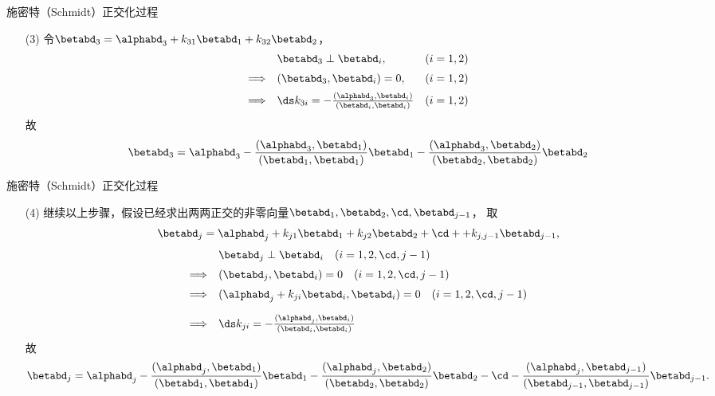 \begin{frame}
  \begin{footnotesize}
    \begin{block}{施密特（Schmidt）正交化过程}
      
      \begin{itemize}
      \item[(3)] 令$\betabd_3=\alphabd_3+k_{31}\betabd_1+k_{32}\betabd_2$，
        $$
        \begin{array}{rll}
          &\betabd_3\perp\betabd_i, & (i=1,2)\\[0.2cm]
          \Longrightarrow&(\betabd_3,\betabd_i)=0, & (i=1,2)\\[0.2cm]
          \Longrightarrow& \ds k_{3i}=-\frac{(\alphabd_3,\betabd_i)}{(\betabd_i,\betabd_i)} & (i=1,2)
        \end{array}
        $$
        故
        $$
        \betabd_3=\alphabd_3-\frac{(\alphabd_3,\betabd_1)}{(\betabd_1,\betabd_1)}\betabd_1
        -\frac{(\alphabd_3,\betabd_2)}{(\betabd_2,\betabd_2)}\betabd_2
        $$
      \end{itemize}
    \end{block}

  \end{footnotesize}
\end{frame}


\begin{frame}
  \begin{footnotesize}
    \begin{block}{施密特（Schmidt）正交化过程}
      
      \begin{itemize}
      \item[(4)] 继续以上步骤，假设已经求出两两正交的非零向量$\betabd_1,\betabd_2,\cd,\betabd_{j-1}$，
        取
        $$
        \betabd_j=\alphabd_j+k_{j1}\betabd_1+k_{j2}\betabd_2+\cd++k_{j,j-1}\betabd_{j-1},
        $$
        $$
        \begin{array}{rl}
          & \betabd_j \perp \betabd_i\quad (i=1,2,\cd,j-1)\\[0.2cm]
          \Longrightarrow &(\betabd_j,\betabd_i)=0 \quad (i=1,2,\cd,j-1)\\[0.2cm]
          \Longrightarrow &(\alphabd_j+k_{ji}\betabd_i,\betabd_i)=0 \quad (i=1,2,\cd,j-1)\\[0.4cm]
          \Longrightarrow& \ds k_{ji}=-\frac{(\alphabd_j,\betabd_i)}{(\betabd_i,\betabd_i)}
        \end{array}
        $$
        故
        $$
        \betabd_j=\alphabd_j-\frac{(\alphabd_j,\betabd_1)}{(\betabd_1,\betabd_1)}\betabd_1
        -\frac{(\alphabd_j,\betabd_2)}{(\betabd_2,\betabd_2)}\betabd_2
        -\cd
        -\frac{(\alphabd_j,\betabd_{j-1})}{(\betabd_{j-1},\betabd_{j-1})}\betabd_{j-1}.
        $$
      \end{itemize}
    \end{block}
  \end{footnotesize}
\end{frame}


